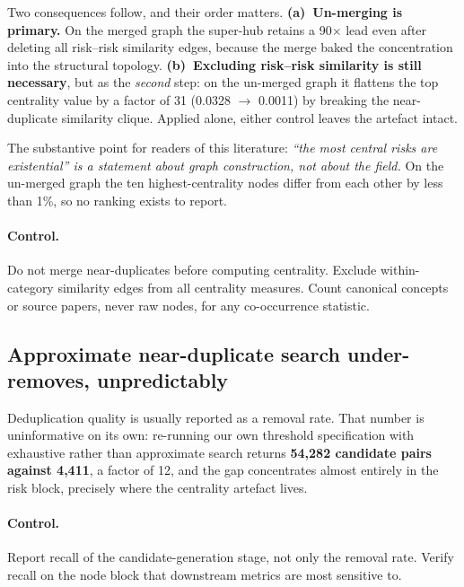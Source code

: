 \documentclass[10pt,twocolumn,letterpaper]{article}
\begin{document}
Two consequences follow, and their order matters. \textbf{(a)~Un-merging is
primary.} On the merged graph the super-hub retains a 90$\times$ lead even after
deleting all risk--risk similarity edges, because the merge baked the
concentration into the structural topology. \textbf{(b)~Excluding risk--risk
similarity is still necessary}, but as the \emph{second} step: on the un-merged
graph it flattens the top centrality value by a factor of 31 (0.0328
$\rightarrow$ 0.0011) by breaking the near-duplicate similarity clique. Applied
alone, either control leaves the artefact intact.

The substantive point for readers of this literature: \emph{``the most central
risks are existential'' is a statement about graph construction, not about the
field.} On the un-merged graph the ten highest-centrality nodes differ from each
other by less than 1\%, so no ranking exists to report.

\paragraph{Control.} Do not merge near-duplicates before computing centrality.
Exclude within-category similarity edges from all centrality measures. Count
canonical concepts or source papers, never raw nodes, for any co-occurrence
statistic.

\subsection{Approximate near-duplicate search under-removes, unpredictably}

Deduplication quality is usually reported as a removal rate. That number is
uninformative on its own: re-running our own threshold specification with
exhaustive rather than approximate search returns \textbf{54{,}282 candidate
pairs against 4{,}411}, a factor of 12, and the gap concentrates almost entirely
in the risk block, precisely where the centrality artefact lives.

\paragraph{Control.} Report recall of the candidate-generation stage, not only
the removal rate. Verify recall on the node block that downstream metrics are
most sensitive to.
\end{document}
